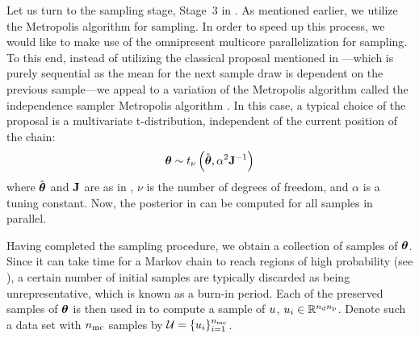 Let us turn to the sampling stage, Stage~3 in . As mentioned earlier, we utilize the Metropolis algorithm for sampling. In order to speed up this process, we would like to make use of the omnipresent multicore parallelization for sampling. To this end, instead of utilizing the classical proposal mentioned in ---which is purely sequential as the mean for the next sample draw is dependent on the previous sample---we appeal to a variation of the Metropolis algorithm called the independence sampler Metropolis algorithm \cite{gelman2004}. In this case, a typical choice of the proposal is a multivariate t-distribution, independent of the current position of the chain:
\begin{equation} \elabel{proposal}
  \vparam \sim \studentst{\nu}{\hat{\vparam}}{\alpha^2 \mOI^{-1}}
\end{equation}
where $\hat{{\boldsymbol\theta}}$ and $\mathbf{J}$ are as in , $\nu$ is the number of degrees of freedom, and $\alpha$ is a tuning constant. Now, the posterior in  can be computed for all samples in parallel.

Having completed the sampling procedure, we obtain a collection of samples of ${\boldsymbol\theta}$. Since it can take time for a Markov chain to reach regions of high probability (see ), a certain number of initial samples are typically discarded as being unrepresentative, which is known as a burn-in period.
Each of the preserved samples of ${\boldsymbol\theta}$ is then used in  to compute a sample of $u$, $u_i \in \mathbb{R}^{{n_\text{d}} {n_\text{p}}}$.
Denote such a data set with ${n_\text{mc}}$ samples by $\mathcal{U} = \{ u_i \}_{i = 1}^{n_\text{mc}}$.
